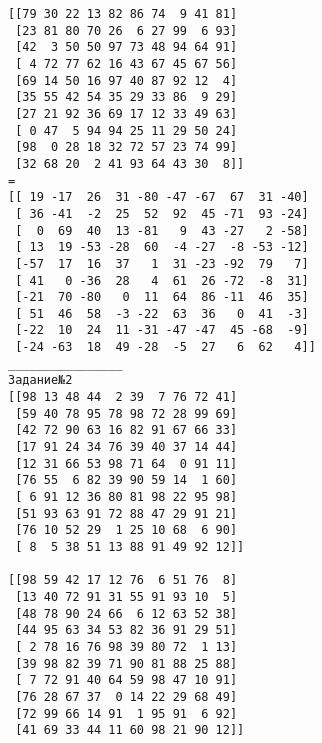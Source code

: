 \documentclass[a4paper]{article}
\begin{document}
\begin{lab5}
\begin{verbatim}
[[79 30 22 13 82 86 74  9 41 81]
 [23 81 80 70 26  6 27 99  6 93]
 [42  3 50 50 97 73 48 94 64 91]
 [ 4 72 77 62 16 43 67 45 67 56]
 [69 14 50 16 97 40 87 92 12  4]
 [35 55 42 54 35 29 33 86  9 29]
 [27 21 92 36 69 17 12 33 49 63]
 [ 0 47  5 94 94 25 11 29 50 24]
 [98  0 28 18 32 72 57 23 74 99]
 [32 68 20  2 41 93 64 43 30  8]]
=
[[ 19 -17  26  31 -80 -47 -67  67  31 -40]
 [ 36 -41  -2  25  52  92  45 -71  93 -24]
 [  0  69  40  13 -81   9  43 -27   2 -58]
 [ 13  19 -53 -28  60  -4 -27  -8 -53 -12]
 [-57  17  16  37   1  31 -23 -92  79   7]
 [ 41   0 -36  28   4  61  26 -72  -8  31]
 [-21  70 -80   0  11  64  86 -11  46  35]
 [ 51  46  58  -3 -22  63  36   0  41  -3]
 [-22  10  24  11 -31 -47 -47  45 -68  -9]
 [-24 -63  18  49 -28  -5  27   6  62   4]]
________________
Задание№2
[[98 13 48 44  2 39  7 76 72 41]
 [59 40 78 95 78 98 72 28 99 69]
 [42 72 90 63 16 82 91 67 66 33]
 [17 91 24 34 76 39 40 37 14 44]
 [12 31 66 53 98 71 64  0 91 11]
 [76 55  6 82 39 90 59 14  1 60]
 [ 6 91 12 36 80 81 98 22 95 98]
 [51 93 63 91 72 88 47 29 91 21]
 [76 10 52 29  1 25 10 68  6 90]
 [ 8  5 38 51 13 88 91 49 92 12]]

[[98 59 42 17 12 76  6 51 76  8]
 [13 40 72 91 31 55 91 93 10  5]
 [48 78 90 24 66  6 12 63 52 38]
 [44 95 63 34 53 82 36 91 29 51]
 [ 2 78 16 76 98 39 80 72  1 13]
 [39 98 82 39 71 90 81 88 25 88]
 [ 7 72 91 40 64 59 98 47 10 91]
 [76 28 67 37  0 14 22 29 68 49]
 [72 99 66 14 91  1 95 91  6 92]
 [41 69 33 44 11 60 98 21 90 12]]
    \end{verbatim}
    \end{lab5}
    
\end{document}
